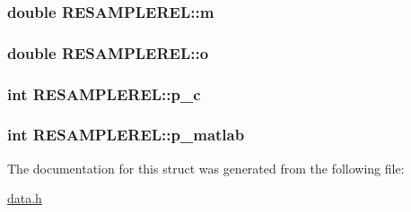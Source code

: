 \hypertarget{struct_r_e_s_a_m_p_l_e_r_e_l_e79ba9ecbed03cad26e60975bbf1e5e8}{
\subsubsection[{m}]{\setlength{\rightskip}{0pt plus 5cm}double {\bf RESAMPLEREL::m}}}
\label{struct_r_e_s_a_m_p_l_e_r_e_l_e79ba9ecbed03cad26e60975bbf1e5e8}


\hypertarget{struct_r_e_s_a_m_p_l_e_r_e_l_8dede6d5ed8f2366265324e7a1a167c3}{
\subsubsection[{o}]{\setlength{\rightskip}{0pt plus 5cm}double {\bf RESAMPLEREL::o}}}
\label{struct_r_e_s_a_m_p_l_e_r_e_l_8dede6d5ed8f2366265324e7a1a167c3}


\hypertarget{struct_r_e_s_a_m_p_l_e_r_e_l_3e7691b7e3a7ecca2c7c1b2c492aae74}{
\subsubsection[{p\_\-c}]{\setlength{\rightskip}{0pt plus 5cm}int {\bf RESAMPLEREL::p\_\-c}}}
\label{struct_r_e_s_a_m_p_l_e_r_e_l_3e7691b7e3a7ecca2c7c1b2c492aae74}


\hypertarget{struct_r_e_s_a_m_p_l_e_r_e_l_471ee590f554002023996f1e76d6e696}{
\subsubsection[{p\_\-matlab}]{\setlength{\rightskip}{0pt plus 5cm}int {\bf RESAMPLEREL::p\_\-matlab}}}
\label{struct_r_e_s_a_m_p_l_e_r_e_l_471ee590f554002023996f1e76d6e696}




The documentation for this struct was generated from the following file:\begin{CompactItemize}
\item 
\hyperlink{data_8h}{data.h}\end{CompactItemize}
